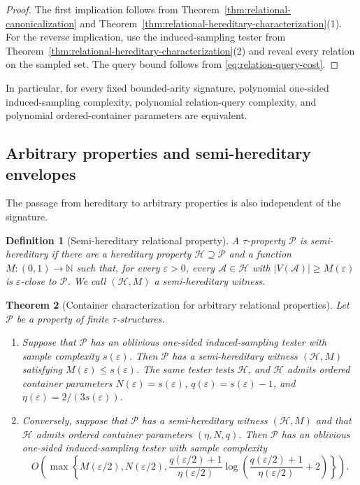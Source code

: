 \documentclass[11pt,reqno,letterpaper]{amsart}
\newcommand{\N}{{\mathbb N}}
\newcommand{\cA}{{\mathcal A}}
\newcommand{\cH}{{\mathcal H}}
\newcommand{\cP}{{\mathcal P}}
\theoremstyle{plain}
\newtheorem{thm}{Theorem}[section]
\newtheorem{defn}[thm]{Definition}
\theoremstyle{remark}
\begin{document}
\begin{proof}
The first implication follows from
Theorem~\ref{thm:relational-canonicalization} and
Theorem~\ref{thm:relational-hereditary-characterization}(1).  For the reverse
implication, use the induced-sampling tester from
Theorem~\ref{thm:relational-hereditary-characterization}(2) and reveal every
relation on the sampled set.  The query bound follows from
\eqref{eq:relation-query-cost}.
\end{proof}

In particular, for every fixed bounded-arity signature, polynomial one-sided
induced-sampling complexity, polynomial relation-query complexity, and
polynomial ordered-container parameters are equivalent.

\subsection{Arbitrary properties and semi-hereditary envelopes}

The passage from hereditary to arbitrary properties is also independent of
the signature.

\begin{defn}[Semi-hereditary relational property]
A $\tau$-property $\cP$ is \textit{semi-hereditary} if there are a hereditary
property $\cH\supseteq\cP$ and a function $M:(0,1)\to\N$ such that, for every
$\varepsilon>0$, every $\cA\in\cH$ with
$|V(\cA)|\geq M(\varepsilon)$ is $\varepsilon$-close to $\cP$.  We call
$(\cH,M)$ a semi-hereditary witness.
\end{defn}

\begin{thm}[Container characterization for arbitrary relational properties]
\label{thm:relational-semi-characterization}
Let $\cP$ be a property of finite $\tau$-structures.
\begin{enumerate}
\item Suppose that $\cP$ has an oblivious one-sided induced-sampling
tester with sample complexity $s(\varepsilon)$.  Then $\cP$ has a
semi-hereditary witness $(\cH,M)$ satisfying
\(M(\varepsilon)\leq s(\varepsilon)\).
The same tester tests $\cH$, and $\cH$ admits ordered container parameters
\(N(\varepsilon)=s(\varepsilon)\), \( q(\varepsilon)=s(\varepsilon)-1\), and \(\eta(\varepsilon)={2}/{(3s(\varepsilon))}\).

\item Conversely, suppose that $\cP$ has a semi-hereditary witness
$(\cH,M)$ and that $\cH$ admits ordered container parameters
$(\eta,N,q)$.  Then $\cP$ has an oblivious one-sided induced-sampling
tester with sample complexity
\begin{equation}
\label{eq:relational-semi-sample}
O\!\left(
\max\left\{
M(\varepsilon/2),
N(\varepsilon/2),
\frac{q(\varepsilon/2)+1}{\eta(\varepsilon/2)}
\log\left(
\frac{q(\varepsilon/2)+1}{\eta(\varepsilon/2)}+2
\right)
\right\}
\right).
\end{equation}
\end{enumerate}
\end{thm}
\end{document}
